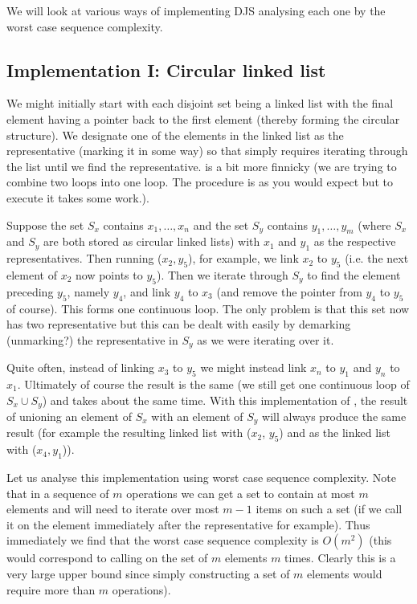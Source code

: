 We will look at various ways of implementing DJS analysing each one by the worst case sequence complexity.

\subsection{Implementation I: Circular linked list}


We might initially start with each disjoint set being a linked list with the final element having a pointer back to the first element (thereby forming the circular structure). We designate one of the elements in the linked list as the representative (marking it in some way) so that  simply requires iterating through the list until we find the representative.  is a bit more finnicky (we are trying to combine two loops into one loop. The procedure is as you would expect but to execute it takes some work.).

Suppose the set $S_x$ contains $x_1, \dots, x_n$ and the set $S_y$ contains $y_1, \dots, y_m$ (where $S_x$ and $S_y$ are both stored as circular linked lists) with $x_1$ and $y_1$ as the respective representatives. Then running ($x_2, y_5$), for example, we link $x_2$ to $y_5$ (i.e. the next element of $x_2$ now points to $y_5$). Then we iterate through $S_y$ to find the element preceding $y_5$, namely $y_4$, and link $y_4$ to $x_3$ (and remove the pointer from $y_4$ to $y_5$ of course). This forms one continuous loop. The only problem is that this set now has two representative but this can be dealt with easily by demarking (unmarking?) the representative in $S_y$ as we were iterating over it.

\begin{remark}\label{rem:impl1-convention}
Quite often, instead of linking $x_3$ to $y_5$ we might instead link $x_n$ to $y_1$ and $y_n$ to $x_1$. Ultimately of course the result is the same (we still get one continuous loop of $S_x \cup S_y$) and takes about the same time. With this implementation of , the result of unioning an element of $S_x$ with an element of $S_y$ will always produce the same result (for example the resulting linked list with ($x_2$, $y_5$) and as the linked list with ($x_4, y_1$)). 
\end{remark}

Let us analyse this implementation using worst case sequence complexity. Note that in a sequence of $m$ operations we can get a set to contain at most $m$ elements and  will need to iterate over most $m - 1$ items on such a set (if we call it on the element immediately after the representative for example). Thus immediately we find that the worst case sequence complexity is $O(m^2)$ (this would correspond to calling  on the set of $m$ elements $m$ times. Clearly this is a very large upper bound since simply constructing a set of $m$ elements would require more than $m$ operations). 

